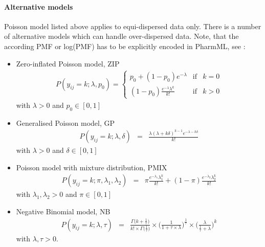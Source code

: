 \paragraph{Alternative models} 
\label{subsubsec:alternatives}
Poisson model listed above applies to equi-dispersed data only.
There is a number of alternative models which can handle over-dispersed data. 
Note, that the according PMF or log(PMF) has to be explicitly encoded in PharmML, see \cite{Plan:2009fk}:
\begin{itemize}%
\item
Zero-inflated Poisson model, ZIP
\begin{eqnarray}
P(y_{ij} = k; \lambda, p_0) =  \left\{ \begin{array}{rcl} p_0 + (1-p_0) e^{-\lambda} & \mbox{if} & k = 0 \\ 
(1-p_0)\frac{e^{-\lambda}\lambda^k}{k!} & \mbox{if} & k > 0 \end{array}\right. \nonumber
\end{eqnarray}
with $\lambda > 0$ and $p_0 \in [0,1]$
\item
Generalised Poisson model, GP
\begin{eqnarray}
P(y_{ij} = k; \lambda, \delta) &=& \frac{\lambda (\lambda + k \delta)^{k-1} e^{-\lambda - k\delta}}{k!} \nonumber
\end{eqnarray}
with $\lambda > 0$ and  $\delta \in [0,1]$
\item
Poisson model with mixture distribution, PMIX
\begin{eqnarray}
P(y_{ij} = k;\pi,\lambda_1,\lambda_2) &=& \pi \frac{e^{-\lambda_1} \lambda_1^k}{k!} + (1-\pi) \frac{e^{-\lambda_2} \lambda_2^k}{k!} \nonumber
\end{eqnarray}
with $\lambda_1, \lambda_2 > 0$ and $\pi \in [0,1]$
\item
Negative Binomial model, NB
\begin{eqnarray}
P(y_{ij} = k;\lambda,\tau) &=& \frac{\Gamma \big( k + \frac{1}{\tau} \big)}{k! \times \Gamma \big(\frac{1}{\tau} \big)} \times \Bigg( \frac{1}{1 + \tau \times \lambda} \Bigg)^{\frac{1}{\tau}} \times \Bigg(\frac{\lambda}{\frac{1}{\tau} + \lambda} \Bigg)^k \nonumber
\end{eqnarray}
with $\lambda, \tau > 0$.
\end{itemize}

